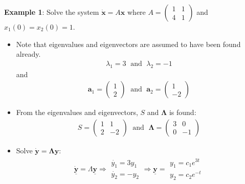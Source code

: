 \documentclass[10pt,a4paper]{article}
\begin{document}
\textbf{Example 1}:  Solve the system $\dot{\textbf{x}} = A \textbf{x}$ where $A = \begin{pmatrix}
    1&1\\4&1
\end{pmatrix}$ and $x_1(0) = x_2(0) = 1$.
\begin{itemize}
    \item Note that eigenvalues and eigenvectors are assumed to have been found already.
    \begin{align*}
        \lambda_1 = 3 \; \text{ and } \; \lambda_2 = -1
    \end{align*}
    and
    \begin{align*}
        \textbf{a}_1 = \begin{pmatrix}
            1\\2
        \end{pmatrix} \; \text{ and } \; \textbf{a}_2 = \begin{pmatrix}
            1\\-2
        \end{pmatrix}
    \end{align*}
    
    \item From the eigenvalues and eigenvectors, $S$ and $\mathbf{\Lambda}$ is found:
    \begin{align*}
        S = \begin{pmatrix}
            1&1\\2&-2
        \end{pmatrix} \; \text{ and } \; \mathbf{\Lambda} = \begin{pmatrix}
            3&0 \\ 0&-1
        \end{pmatrix}
    \end{align*}

    \item Solve $\dot{\textbf{y}} = \mathbf{\Lambda} \textbf{y}$:
    \begin{align*}
        \underline{\dot{\mathbf{y}}}=\Lambda \underline{\mathbf{y}} \Rightarrow \begin{array}{l}
            \dot{y_{1}}=3 y_{1} \\
            \dot{y_{2}}=-y_{2}
            \end{array} \Rightarrow \underline{\mathbf{y}}=\begin{array}{l}
            y_{1}=c_{1} e^{3 t} \\
            y_{2}=c_{2} e^{-t}
            \end{array}
    \end{align*}


\end{itemize}
\end{document}
